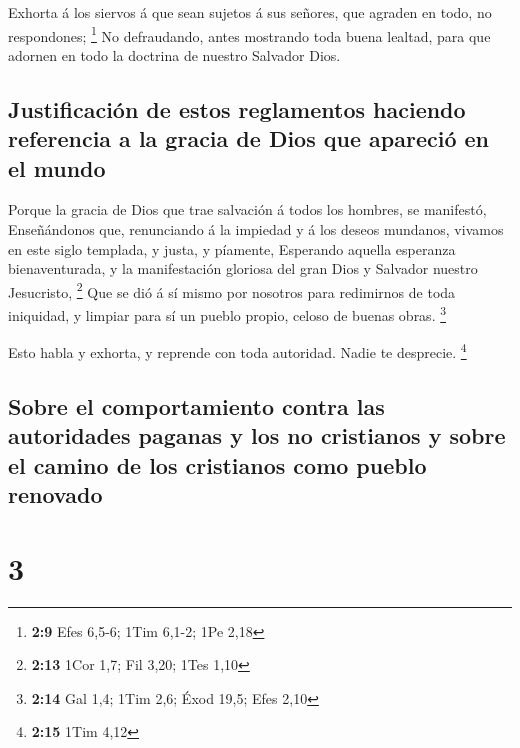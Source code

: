  Exhorta á los siervos á que sean sujetos á sus señores, que
agraden en todo, no respondones; \footnote{\textbf{2:9} Efes 6,5-6; 1Tim
  6,1-2; 1Pe 2,18}  No defraudando, antes mostrando toda
buena lealtad, para que adornen en todo la doctrina de nuestro Salvador
Dios.

\hypertarget{justificaciuxf3n-de-estos-reglamentos-haciendo-referencia-a-la-gracia-de-dios-que-apareciuxf3-en-el-mundo}{%
\subsection{Justificación de estos reglamentos haciendo referencia a la
gracia de Dios que apareció en el
mundo}\label{justificaciuxf3n-de-estos-reglamentos-haciendo-referencia-a-la-gracia-de-dios-que-apareciuxf3-en-el-mundo}}

 Porque la gracia de Dios que trae salvación á todos los
hombres, se manifestó,  Enseñándonos que, renunciando á la
impiedad y á los deseos mundanos, vivamos en este siglo templada, y
justa, y píamente,  Esperando aquella esperanza
bienaventurada, y la manifestación gloriosa del gran Dios y Salvador
nuestro Jesucristo, \footnote{\textbf{2:13} 1Cor 1,7; Fil 3,20; 1Tes
  1,10}  Que se dió á sí mismo por nosotros para redimirnos
de toda iniquidad, y limpiar para sí un pueblo propio, celoso de buenas
obras. \footnote{\textbf{2:14} Gal 1,4; 1Tim 2,6; Éxod 19,5; Efes 2,10}

 Esto habla y exhorta, y reprende con toda autoridad. Nadie
te desprecie. \footnote{\textbf{2:15} 1Tim 4,12}

\hypertarget{sobre-el-comportamiento-contra-las-autoridades-paganas-y-los-no-cristianos-y-sobre-el-camino-de-los-cristianos-como-pueblo-renovado}{%
\subsection{Sobre el comportamiento contra las autoridades paganas y los
no cristianos y sobre el camino de los cristianos como pueblo
renovado}\label{sobre-el-comportamiento-contra-las-autoridades-paganas-y-los-no-cristianos-y-sobre-el-camino-de-los-cristianos-como-pueblo-renovado}}

\hypertarget{section-2}{%
\section{3}\label{section-2}}


